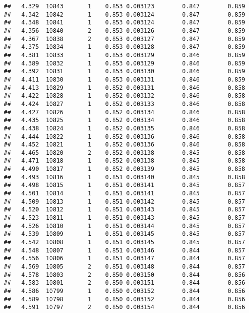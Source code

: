 \documentclass[
]{book}
\begin{document}
\begin{verbatim}
##   4.329  10843       1    0.853 0.003123        0.847        0.859
##   4.342  10842       1    0.853 0.003124        0.847        0.859
##   4.348  10841       1    0.853 0.003124        0.847        0.859
##   4.356  10840       2    0.853 0.003126        0.847        0.859
##   4.367  10838       2    0.853 0.003127        0.847        0.859
##   4.375  10834       1    0.853 0.003128        0.847        0.859
##   4.381  10833       1    0.853 0.003129        0.846        0.859
##   4.389  10832       1    0.853 0.003129        0.846        0.859
##   4.392  10831       1    0.853 0.003130        0.846        0.859
##   4.411  10830       1    0.853 0.003131        0.846        0.859
##   4.413  10829       1    0.852 0.003131        0.846        0.858
##   4.422  10828       1    0.852 0.003132        0.846        0.858
##   4.424  10827       1    0.852 0.003133        0.846        0.858
##   4.427  10826       1    0.852 0.003134        0.846        0.858
##   4.435  10825       1    0.852 0.003134        0.846        0.858
##   4.438  10824       1    0.852 0.003135        0.846        0.858
##   4.444  10822       1    0.852 0.003136        0.846        0.858
##   4.452  10821       1    0.852 0.003136        0.846        0.858
##   4.465  10820       2    0.852 0.003138        0.845        0.858
##   4.471  10818       1    0.852 0.003138        0.845        0.858
##   4.490  10817       1    0.852 0.003139        0.845        0.858
##   4.493  10816       1    0.851 0.003140        0.845        0.858
##   4.498  10815       1    0.851 0.003141        0.845        0.857
##   4.501  10814       1    0.851 0.003141        0.845        0.857
##   4.509  10813       1    0.851 0.003142        0.845        0.857
##   4.520  10812       1    0.851 0.003143        0.845        0.857
##   4.523  10811       1    0.851 0.003143        0.845        0.857
##   4.526  10810       1    0.851 0.003144        0.845        0.857
##   4.539  10809       1    0.851 0.003145        0.845        0.857
##   4.542  10808       1    0.851 0.003145        0.845        0.857
##   4.548  10807       1    0.851 0.003146        0.844        0.857
##   4.556  10806       1    0.851 0.003147        0.844        0.857
##   4.569  10805       2    0.851 0.003148        0.844        0.857
##   4.578  10803       2    0.850 0.003150        0.844        0.856
##   4.583  10801       2    0.850 0.003151        0.844        0.856
##   4.586  10799       1    0.850 0.003152        0.844        0.856
##   4.589  10798       1    0.850 0.003152        0.844        0.856
##   4.591  10797       2    0.850 0.003154        0.844        0.856

\end{verbatim}
\end{document}
